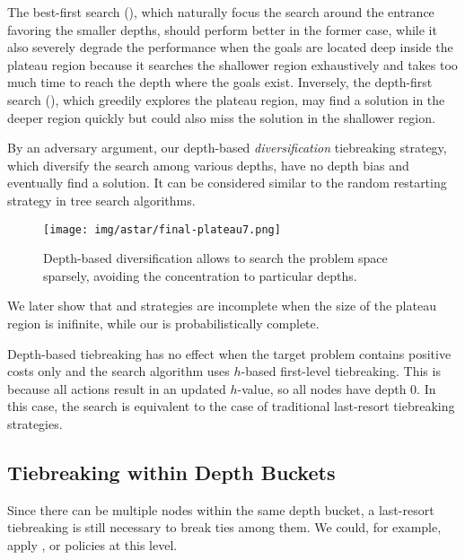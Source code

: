 


The best-first search (\fifo), which naturally focus the search around
the entrance favoring the smaller depths, should perform better in the
former case, while it also severely degrade the performance when the
goals are located deep inside the plateau region because it searches the
shallower region exhaustively and takes too much time to reach the depth
where the goals exist.
Inversely, the depth-first search (\lifo), which greedily explores the
plateau region, may find a solution in the deeper region quickly but
could also miss the solution in the shallower region.

By an adversary argument, our depth-based \emph{diversification}
tiebreaking strategy, which diversify the search among various depths,
have no depth bias and eventually find a solution. It can be considered
similar to the random restarting strategy in tree search algorithms.

\begin{figure}[htbp]
 \texttt{[image: img/astar/final-plateau7.png]}
 \caption{Depth-based diversification allows to search the problem space
 sparsely, avoiding the concentration to particular depths.}
 \label{fig:plateau-depiction-all-optimal}
\end{figure}


We later show that
\fifo and \lifo strategies are incomplete when the size of the plateau
region is inifinite, while our \id is probabilistically complete.

Depth-based tiebreaking has no effect when the target problem contains
positive costs only and the search algorithm uses $h$-based first-level
tiebreaking.  This is because all actions result in an updated
$h$-value, so all nodes have depth 0. In this case, the search is
equivalent to the case of traditional last-resort tiebreaking strategies.

\subsection{Tiebreaking within Depth Buckets}

Since there can be multiple nodes within the same depth bucket,
a last-resort tiebreaking is still necessary to break ties among them.
We could, for example, apply \lifo, \fifo or \ro policies at this level.

